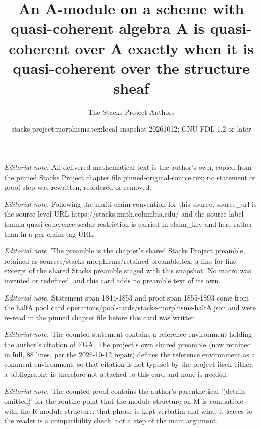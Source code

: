 \documentclass[10pt,a4paper]{amsart}
\title{An A-module on a scheme with quasi-coherent algebra A is quasi-coherent over A exactly when it is quasi-coherent over the structure sheaf}
\author{The Stacks Project Authors}
\date{stacks-project:morphisms.tex:local-snapshot-20261012; GNU FDL 1.2 or later}
\theoremstyle{plain}
\theoremstyle{definition}
\theoremstyle{remark}
\numberwithin{equation}{subsection}
\begin{document}
\maketitle
\noindent\textit{Editorial note.} All delivered mathematical text is the author's own, copied from the pinned Stacks Project chapter file pinned-original-source.tex; no statement or proof step was rewritten, reordered or removed.\par\medskip
\noindent\textit{Editorial note.} Following the multi-claim convention for this source, source\_url is the source-level URL https://stacks.math.columbia.edu/ and the source label lemma-quasi-coherence-scalar-restriction is carried in claim\_key and here rather than in a per-claim tag URL.\par\medskip
\noindent\textit{Editorial note.} The preamble is the chapter's shared Stacks Project preamble, retained as sources/stacks-morphisms/retained-preamble.tex: a line-for-line excerpt of the shared Stacks preamble staged with this snapshot. No macro was invented or redefined, and this card adds no preamble text of its own.\par\medskip
\noindent\textit{Editorial note.} Statement span 1844-1853 and proof span 1855-1893 come from the halfA pool card operations/pool-cards/stacks-morphisms-halfA.json and were re-read in the pinned chapter file before this card was written.\par\medskip
\noindent\textit{Editorial note.} The counted statement contains a reference environment holding the author's citation of EGA. The project's own shared preamble (now retained in full, 88 lines, per the 2026-10-12 repair) defines the reference environment as a comment environment, so that citation is not typeset by the project itself either; a bibliography is therefore not attached to this card and none is needed.\par\medskip
\noindent\textit{Editorial note.} The counted proof contains the author's parenthetical '(details omitted)' for the routine point that the module structure on M is compatible with the R-module structure; that phrase is kept verbatim and what it leaves to the reader is a compatibility check, not a step of the main argument.\par\medskip
\end{document}

